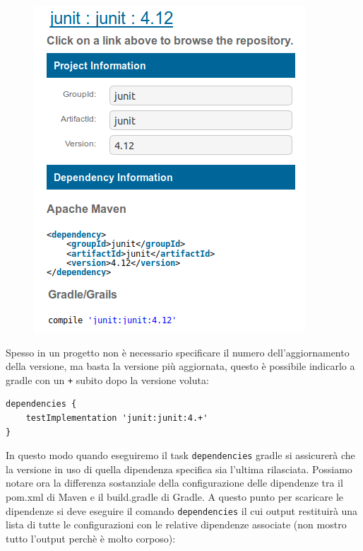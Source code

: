 \begin{figure}[H]
\centering
\includegraphics[width=0.4\linewidth]{3DependencyManagement/javaDep/gradleInMavenRepo.png}
\end{figure}
Spesso in un progetto non è necessario specificare il numero dell'aggiornamento della versione, ma basta la versione più aggiornata, questo è possibile indicarlo a gradle con un \texttt{+} subito dopo la versione voluta:
\begin{lstlisting}[frame=single]
dependencies {
    testImplementation 'junit:junit:4.+'
} \end{lstlisting}
In questo modo quando eseguiremo il task \texttt{dependencies} gradle si assicurerà che la versione in uso di quella dipendenza specifica sia l'ultima rilasciata. Possiamo notare ora la differenza sostanziale della configurazione delle dipendenze tra il pom.xml di Maven e il build.gradle di Gradle. A questo punto per scaricare le dipendenze si deve eseguire il comando \texttt{dependencies} il cui output restituirà una lista di tutte le configurazioni con le relative dipendenze associate (non mostro tutto l'output perchè è molto corposo):

